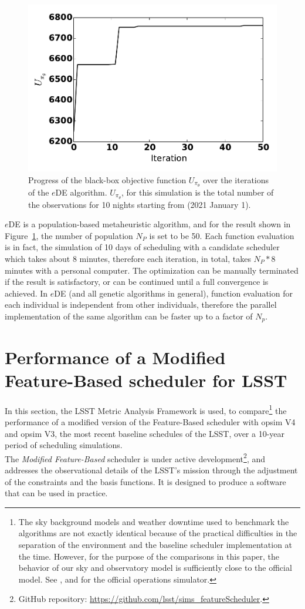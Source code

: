 \documentclass[12pt]{aastex62}
\theoremstyle{definition}
\begin{document}
\begin{figure}[h!]
\begin{center}
\includegraphics[width=0.5\linewidth]{eDEObjectiveFunction.pdf}
\caption{Progress of the black-box objective function $U_{\pi_{\theta}}$ over the iterations of the $e$DE algorithm. $U_{\pi_{\theta}}$, for this simulation is the total number of the observations for 10 nights starting from (2021 January 1).}
\label{fig_eDEObjectiveFunction}
\end{center}
\end{figure}

$e$DE is a population-based metaheuristic algorithm, and for the result shown in Figure~\ref{fig_eDEObjectiveFunction}, the number of population $N_P$ is set to be 50. Each function evaluation is in fact, the simulation of 10 days of scheduling with a candidate scheduler which takes about 8 minutes, therefore each iteration, in total, takes $N_P * 8$ minutes with a personal computer. The optimization can be manually terminated if the result is satisfactory, or can be continued until a full convergence is achieved. In $e$DE (and all genetic algorithms in general), function evaluation for each individual is independent from other individuals, therefore the parallel implementation of the same algorithm can be faster up to a factor of $N_p$. 

 
\section{Performance of a Modified Feature-Based scheduler for LSST}\label{sec_comp}
In this section, the LSST Metric Analysis Framework \citep{jones2014lsst} is used, to compare\footnote{The sky background models and weather downtime used to benchmark the algorithms are not exactly identical because of the practical difficulties in the separation of the environment and the baseline scheduler implementation at the time. However, for the purpose of the comparisons in this paper, the behavior of our sky and observatory model is sufficiently close to the official model. See \citep{2016SPIE.9910E..13D}, and \citep{2016SPIE.9911E..25R} for the official operations simulator.} the performance of a modified version of the Feature-Based scheduler with opsim V4 and opsim V3, the most recent baseline schedules of the LSST, over a 10-year period of scheduling simulations.\\
The \textit{Modified Feature-Based} scheduler is under active development\footnote{GitHub repository: \url{https://github.com/lsst/sims_featureScheduler}.}, and addresses the observational details of the LSST's mission through the adjustment of the constraints and the basis functions. It is designed to produce a software that can be used in practice. 
\end{document}
